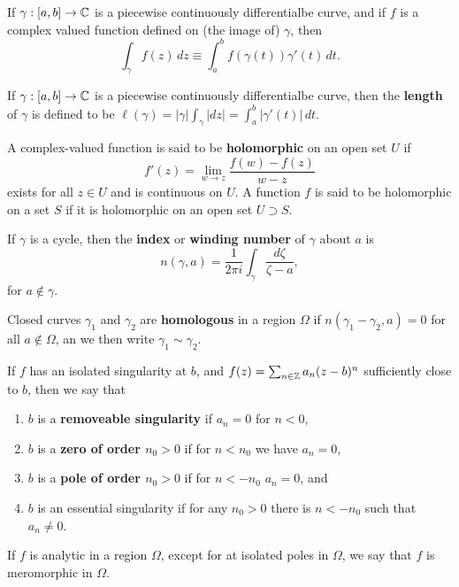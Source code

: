 \documentclass[12pt]{article}
\begin{document}
\begin{definition}
    If $\gamma:[a,b]\to\mathbb{C}$ is a piecewise continuously differentialbe curve, and if $f$ is a complex valued function defined on (the image of) $\gamma$, then
    \begin{equation}
        \int_{\gamma}f(z)\,dz\equiv\int_{a}^bf(\gamma(t))\gamma'(t)\,dt.
    \end{equation}
\end{definition}
\begin{definition}
    If $\gamma:[a,b]\to\mathbb{C}$ is a piecewise continuously differentialbe curve, then the \textbf{length} of $\gamma$ is defined to be $\ell(\gamma)=|\gamma|\int_\gamma |dz|=\int_a^b|\gamma'(t)|\,dt$.
\end{definition}

\begin{definition}
    A complex-valued function is said to be \textbf{holomorphic} on an open set $U$ if
    \begin{equation*}
        f'(z)=\lim_{w\to z} \frac{f(w)-f(z)}{w-z}
    \end{equation*}
    exists for all $z\in U$ and is continuous on $U$. A function $f$ is said to be holomorphic on a set $S$ if it is holomorphic on an open set $U\supset S$.
\end{definition}
\begin{definition}
    If $\gamma$ is a cycle, then the \textbf{index} or \textbf{winding number} of $\gamma$ about $a$ is 
    \begin{equation*}
        n(\gamma,a)=\frac{1}{2\pi i}\int_\gamma \frac{d\zeta}{\zeta-a},
    \end{equation*}
    for $a\notin\gamma$.
\end{definition}
\begin{definition}
    Closed curves $\gamma_1$ and $\gamma_2$ are \textbf{homologous} in a region $\Omega$ if $n(\gamma_1-\gamma_2,a)=0$ for all $a\notin \Omega$, an we then write $\gamma_1\sim \gamma_2$.
\end{definition}
\begin{definition}
    If $f$ has an isolated singularity at $b$, and $f(z)=\sum_{n\in\mathbb{Z}} a_n(z-b)^n$ sufficiently close to $b$, then we say that
    \begin{enumerate}[label=(\alph*)]
        \item $b$ is a \textbf{removeable singularity} if $a_n=0$ for $n<0$,
        \item $b$ is a \textbf{zero of order $n_0>0$} if for $n<n_0$ we have $a_n=0$,
        \item $b$ is a \textbf{pole of order $n_0>0$} if for $n<-n_0$ $a_n=0$, and
        \item $b$ is an essential singularity if for any $n_0>0$ there is $n<-n_0$ such that $a_n\neq 0$.  
    \end{enumerate}
\end{definition}
\begin{definition}
    If $f$ is analytic in a region $\Omega$, except for at isolated poles in $\Omega$, we say that $f$ is meromorphic in $\Omega$.
\end{definition}
\end{document}
